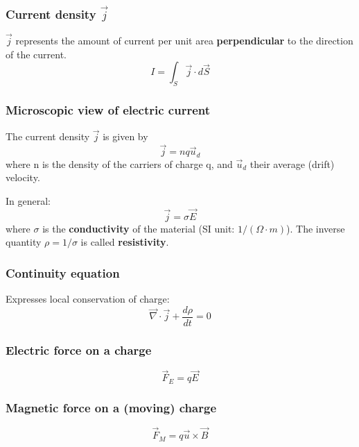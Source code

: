 \documentclass[english,11pt]{article}
\begin{document}
\subsubsection*{\bf Current density $\vec{j}$}

$\vec{j}$ represents the amount of current per unit area {\bf perpendicular} to the direction of the current.
\begin{equation*}
  I = \int_{S} \vec{j} \cdot d\vec{S}
\end{equation*}

\subsubsection*{\bf Microscopic view of electric current}

The current density $\vec{j}$ is given by
\begin{equation*}
  \vec{j} = n q \vec{u}_{d}
\end{equation*}
where n is the density of the carriers of charge q, and $\vec{u}_{d}$ their average (drift) velocity.

In general:
\begin{equation*}
  \vec{j} = \sigma \vec{E}
\end{equation*}
where $\sigma$ is the {\bf conductivity} of the material (SI unit: $1/(\Omega \cdot m)$).
The inverse quantity $\rho = 1/\sigma$ is called {\bf resistivity}.

\subsubsection*{\bf Continuity equation}

Expresses local conservation of charge:
\begin{equation*}
    \vec{\nabla} \cdot \vec{j} +\frac{d\rho}{dt} = 0
\end{equation*}


\subsubsection*{\bf Electric force on a charge}
\begin{equation*}
  \vec{F}_{E} = q \vec{E}
\end{equation*}

\subsubsection*{\bf Magnetic force on a (moving) charge}
\begin{equation*}
  \vec{F}_{M} = q \vec{u} \times \vec{B}
\end{equation*}
\end{document}

